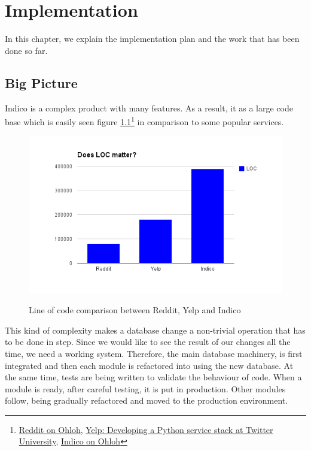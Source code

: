 \chapter{Implementation}

In this chapter, we explain the implementation plan and the work that has been done so far.

\section{Big Picture}

Indico is a complex product with many features. As a result, it as a large code base which is easily seen figure \ref{loccomp}\footnote{\href{https://www.ohloh.net/p/reddit}{Reddit on Ohloh}, \href{http://www.youtube.com/watch?v=MLM2acV\_1yo}{Yelp: Developing a Python service stack at Twitter University}, \href{https://www.ohloh.net/p/indico}{Indico on Ohloh}} in comparison to some popular services.

\begin{figure}[H]
  \caption{Line of code comparison between Reddit, Yelp and Indico}
  \centering
    \includegraphics[scale=0.8]{6/figures/loccomp.png}
  \label{loccomp}
\end{figure}

This kind of complexity makes a database change a non-trivial operation that has to be done in step. Since we would like to see the result of our changes all the time, we need a working system. Therefore, the main database machinery, is first integrated and then each module is refactored into using the new database. At the same time, tests are being written to validate the behaviour of code. When a module is ready, after  careful testing, it is put in production. Other modules follow, being gradually refactored and moved to the production environment.


